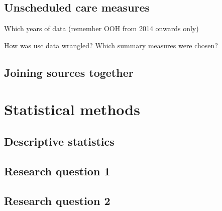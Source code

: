 \documentclass[]{article}
\begin{document}
\subsection{Unscheduled care measures}\label{subsubsec:usc-summs}

Which years of data (remember OOH from 2014 onwards only)

How was usc data wrangled? Which summary measures were chosen?

\subsection{Joining sources together}\label{subsubsec:join-data}

\section{Statistical methods}\label{sec:methods-stats}

\subsection{Descriptive statistics}\label{descr}

\subsection{Research question 1}\label{stats-rq1}

\subsection{Research question 2}\label{stats-rq2}
\end{document}
